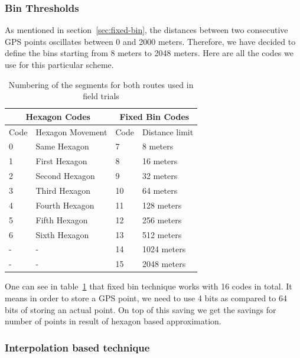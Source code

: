 \documentclass[conference]{IEEEtran}
\begin{document}
\subsubsection{Bin Thresholds}
As mentioned in section~\ref{sec:fixed-bin}, the distances between two consecutive GPS points oscillates between 0 and 2000 meters. Therefore, we have decided to define the bins starting from 8 meters to 2048 meters. Here are all the codes we use for this particular scheme.
\begin{table}[h]
\caption{Numbering of the segments for both routes used in field trials}
\label{tbl:fixed-bin-codes}
\begin{center}
    \begin{tabular}{  |l|l|l|l|  }
	\hline
\multicolumn{2}{|c|}{Hexagon Codes} &\multicolumn{2}{|c|}{Fixed Bin Codes} \\\hline
 Code & Hexagon Movement & Code & Distance limit \\ \hline
0&Same Hexagon&7& 8 meters\\ \hline
1&First Hexagon&8&16 meters \\ \hline
2&Second Hexagon&9& 32 meters\\ \hline
3&Third Hexagon&10&64 meters\\ \hline
4&Fourth Hexagon&11&128 meters\\ \hline
5&Fifth Hexagon&12&256 meters \\ \hline
6&Sixth Hexagon&13&512 meters \\ \hline
-&-&14&1024 meters \\ \hline
-&-&15&2048 meters \\ \hline
\end{tabular}
    \end{center}
\end{table}
One can see in table~\ref{tbl:fixed-bin-codes} that fixed bin technique works with 16 codes in total. It means in order to store a GPS point, we need to use 4 bits as compared to 64 bits of storing an actual point. On top of this saving we get the savings for number of points in result of hexagon based approximation.

\subsubsection{Interpolation based technique}
\end{document}
